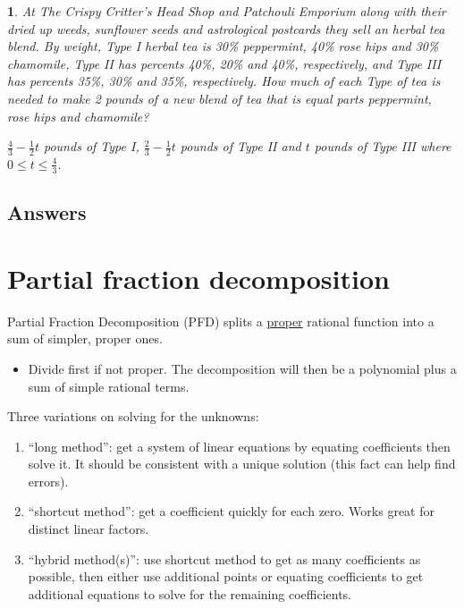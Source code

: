\documentclass{amsbook}
\newtheorem{exc}{}
\newenvironment{ex}{\begin{exc}\normalfont}{\end{exc}}
\numberwithin{section}{chapter}
\numberwithin{equation}{chapter}
\newcommand{\qi}[1]{\begin{itemize}\item #1 \end{itemize}}
\begin{document}
\begin{ex}
	At The Crispy Critter's Head Shop and Patchouli Emporium along with their dried up weeds, sunflower seeds and astrological postcards they sell an herbal tea blend.  By weight, Type I herbal tea is 30\% peppermint, 40\% rose hips and 30\% chamomile, Type II has percents 40\%, 20\% and 40\%, respectively, and Type III has percents 35\%, 30\% and 35\%, respectively.  How much of each Type of tea is needed to make 2 pounds of a new blend of tea that is equal parts peppermint, rose hips and chamomile?  
	\begin{sol}
		$\frac{4}{3}- \frac{1}{2}t$ pounds of Type I, $\frac{2}{3} - \frac{1}{2}t$ pounds of Type II and $t$ pounds of Type III where $0 \leq t \leq \frac{4}{3}$.
	\end{sol}
\end{ex}



\subsection*{Answers \nopunct} \hfill
\begin{multicols}{2}
	
\end{multicols}


\newpage
\section{Partial fraction decomposition}

Partial Fraction Decomposition (PFD) splits a \underline{proper} rational function into a sum of simpler, proper ones.
\qi{Divide first if not proper. The decomposition will then be a polynomial plus a sum of simple rational terms.}

Three variations on solving for the unknowns:
\begin{enumerate}
	\item ``long method'': get a system of linear equations by equating coefficients then solve it. It should be consistent with a unique solution (this fact can help find errors).
	\item ``shortcut method'': get a coefficient quickly for each zero. Works great for distinct linear factors.
	\item ``hybrid method(s)'': use shortcut method to get as many coefficients as possible, then either use additional points or equating coefficients to get additional equations to solve for the remaining coefficients.
\end{enumerate}
\end{document}
